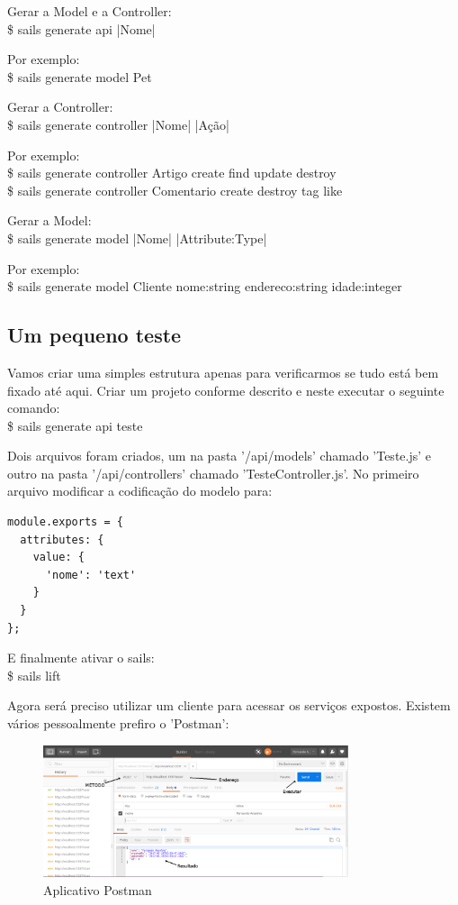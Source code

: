 \documentclass[a4paper,11pt]{article}
\begin{document}
Gerar a Model e a Controller: \\
{\ttfamily\$ sails generate api |Nome|}

Por exemplo: \\
{\ttfamily\$ sails generate model Pet}

Gerar a Controller: \\
{\ttfamily\$ sails generate controller |Nome| |Ação|}

Por exemplo: \\
{\ttfamily\$ sails generate controller Artigo create find update destroy} \\
{\ttfamily\$ sails generate controller Comentario create destroy tag like}

Gerar a Model: \\
{\ttfamily\$ sails generate model |Nome| |Attribute:Type|}

Por exemplo: \\
{\ttfamily\$ sails generate model Cliente nome:string endereco:string idade:integer}

\subsection{Um pequeno teste}
Vamos criar uma simples estrutura apenas para verificarmos se tudo está bem fixado até aqui. Criar um projeto conforme descrito e neste executar o seguinte comando: \\
{\ttfamily\$ sails generate api teste}

Dois arquivos foram criados, um na pasta '/api/models' chamado 'Teste.js' e outro na pasta '/api/controllers' chamado 'TesteController.js'. No primeiro arquivo modificar a codificação 
do modelo para:
\begin{lstlisting}
module.exports = {
  attributes: {
    value: {
      'nome': 'text'
    }
  }
};
\end{lstlisting}

E finalmente ativar o sails: \\
{\ttfamily\$ sails lift}

Agora será preciso utilizar um cliente para acessar os serviços expostos. Existem vários pessoalmente prefiro o 'Postman':
\begin{figure}[H]
	\centering
	\includegraphics[width=0.8\textwidth]{imagens/Postman.png}
	\caption{Aplicativo Postman}
\end{figure}
\end{document}
